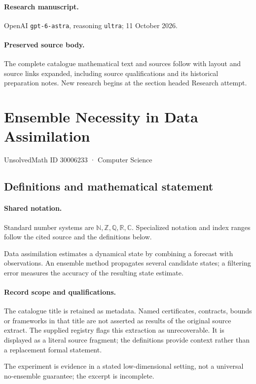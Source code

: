\documentclass[11pt]{article}
\begin{document}
\paragraph{Research manuscript.} OpenAI \texttt{gpt-6-astra}, reasoning \texttt{ultra}; 11 October 2026.
\paragraph{Preserved source body.} The complete catalogue mathematical text and sources follow with layout and source links expanded, including source qualifications and its historical preparation notes. New research begins at the section headed Research attempt.

\section{Ensemble Necessity in Data Assimilation}\label{30006233}
{\small UnsolvedMath ID 30006233 · Computer Science}
\subsection{Definitions and mathematical statement}

\paragraph{Shared notation.}Standard number systems are $\mathbb N,\mathbb Z,\mathbb Q,\mathbb R,\mathbb C$. Specialized notation and index ranges follow the cited source and the definitions below.


Data assimilation estimates a dynamical state by combining a forecast with observations. An ensemble method propagates several candidate states; a filtering error measures the accuracy of the resulting state estimate.
\paragraph{Record scope and qualifications.}
The catalogue title is retained as metadata. Named certificates, contracts, bounds or frameworks in that title are not asserted as results of the original source extract.
The supplied registry flags this extraction as unrecoverable. It is displayed as a literal source fragment; the definitions provide context rather than a replacement formal statement.

The experiment is evidence in a stated low-dimensional setting, not a universal no-ensemble guarantee; the excerpt is incomplete.
\end{document}
